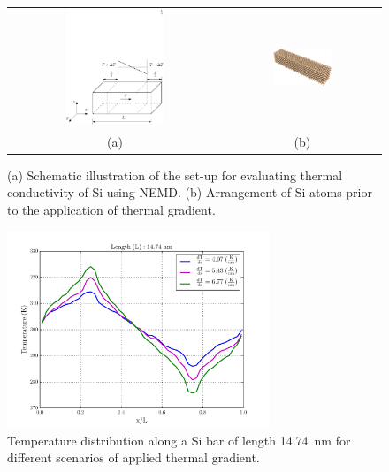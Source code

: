  
 \begin{center}
\begin{figure}[p]
\begin{tabular}{cc}
  \includegraphics[width=0.48\textwidth]{./Figures/schematic}
  &
  \hspace{3mm}
  \includegraphics[width=0.40\textwidth]{./Figures/Sibar_05}
  \\ (a) & (b)
  \end{tabular}
\caption{(a) Schematic illustration of the set-up for evaluating thermal conductivity of Si using NEMD. (b) 
Arrangement of Si atoms prior to the application of thermal gradient.}
\label{fig:setup}
\end{figure}
\end{center}

\clearpage


\begin{figure}[p]
 \begin{center}
  \includegraphics[width=0.70\textwidth]{./Figures/temp_plot}
\caption{Temperature distribution along a Si bar of length 14.74~nm for different scenarios of applied 
thermal gradient.}
\label{fig:kapitza}
\end{center}
\end{figure}


\clearpage


